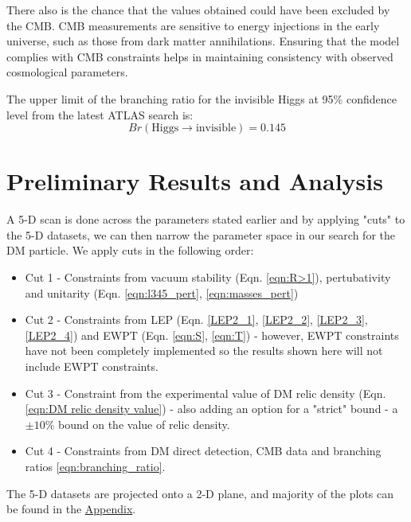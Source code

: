 \documentclass[12pt]{article}
\begin{document}
There also is the chance that the values obtained could have been excluded by the CMB. CMB measurements are sensitive to energy injections in the early universe, such as those from dark matter annihilations. Ensuring that the model complies with CMB constraints helps in maintaining consistency with observed cosmological parameters. 

The upper limit of the branching ratio for the invisible Higgs at 95\% confidence level from the latest ATLAS search is\cite{ATLAS:2022yvh}:
\begin{equation}
    Br(\text{Higgs} \rightarrow \text{invisible}) = 0.145
    \label{eqn:branching_ratio}
\end{equation}


\section{Preliminary Results and Analysis}
A 5-D scan is done across the parameters stated earlier and by applying "cuts" to the 5-D datasets, we can then narrow the parameter space in our search for the DM particle.
We apply cuts in the following order:
\begin{itemize}
    \item Cut 1 - Constraints from vacuum stability (Eqn. \ref{eqn:R>1}), pertubativity and unitarity (Eqn. \ref{eqn:l345_pert}, \ref{eqn:masses_pert}) 
    \item Cut 2 - Constraints from LEP (Eqn. \ref{LEP2_1}, \ref{LEP2_2}, \ref{LEP2_3}, \ref{LEP2_4}) and EWPT (Eqn. \ref{eqn:S}, \ref{eqn:T}) - however, EWPT constraints have not been completely implemented so the results shown here will not include EWPT constraints.
    \item Cut 3 - Constraint from the experimental value of DM relic density (Eqn. \ref{eqn:DM relic density value}) - also adding an option for a "strict" bound - a $\pm 10 \%$ bound on the value of relic density.
    \item Cut 4 - Constraints from DM direct detection, CMB data and branching ratios \ref{eqn:branching_ratio}.
\end{itemize}

The 5-D datasets are projected onto a 2-D plane, and majority of the plots can be found in the \hyperref[sec:Appendix]{Appendix}. 
\end{document}

